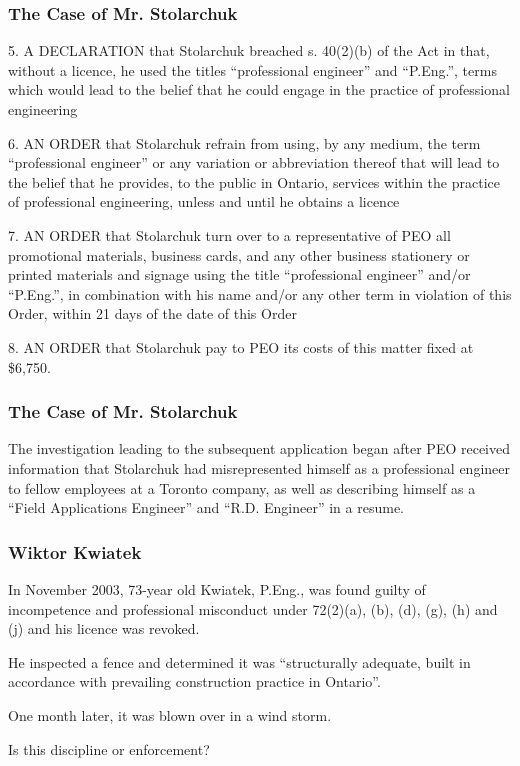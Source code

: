 \begin{frame}
\frametitle{The Case of Mr. Stolarchuk}

5. A DECLARATION that Stolarchuk breached s. 40(2)(b) of the Act in that, without a licence, he used the titles ``professional engineer'' and ``P.Eng.'', terms which would lead to the belief that he could engage in the practice of professional engineering

6. AN ORDER that Stolarchuk refrain from using, by any medium, the term ``professional engineer'' or any variation or abbreviation thereof that will lead to the belief that he provides, to the public in Ontario, services within the practice of professional engineering, unless and until he obtains a licence

7. AN ORDER that Stolarchuk turn over to a representative of PEO all promotional materials, business cards, and any other business stationery or printed materials and signage using the title ``professional engineer'' and/or ``P.Eng.'', in combination with his name and/or any other term in violation of this Order, within 21 days of the date of this Order

8. AN ORDER that Stolarchuk pay to PEO its costs of this matter fixed at \$6,750.

\end{frame}



\begin{frame}
\frametitle{The Case of Mr. Stolarchuk}

The investigation leading to the subsequent application began after PEO received information that Stolarchuk had misrepresented himself as a professional engineer to fellow employees at a Toronto company, as well as describing himself as a ``Field Applications Engineer'' and ``R.D. Engineer'' in a resume.


\end{frame}



\begin{frame}
\frametitle{Wiktor Kwiatek}

In November 2003, 73-year old Kwiatek, P.Eng., was found guilty of incompetence and professional misconduct under 72(2)(a), (b), (d), (g), (h) and (j) and his licence was revoked.

He inspected a fence and determined it was ``structurally adequate, built in accordance with prevailing construction practice in Ontario''.

One month later, it was blown over in a wind storm.

Is this discipline or enforcement?

\end{frame}



